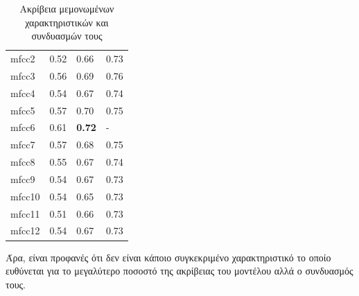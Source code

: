 \begin{table}[H]
\begin{tabular}{llll}
mfcc2                   & 0.52                        & 0.66                       & 0.73                       \\
mfcc3                   & 0.56                        & 0.69                       & 0.76                       \\
mfcc4                   & 0.54                        & 0.67                       & 0.74                       \\
mfcc5                   & 0.57                        & 0.70                       & 0.75                       \\
mfcc6                   & 0.61                        & \textbf{0.72}              & -                          \\
mfcc7                   & 0.57                        & 0.68                       & 0.75                       \\
mfcc8                   & 0.55                        & 0.67                       & 0.74                       \\
mfcc9                   & 0.54                        & 0.67                       & 0.73                       \\
mfcc10                  & 0.54                        & 0.65                       & 0.73                       \\
mfcc11                  & 0.51                        & 0.66                       & 0.73                       \\
mfcc12                  & 0.54                        & 0.67                       & 0.73                      
\end{tabular}
\caption{Ακρίβεια μεμονωμένων χαρακτηριστικών και συνδυασμών τους}
\end{table}

Άρα, είναι προφανές ότι δεν είναι κάποιο συγκεκριμένο χαρακτηριστικό το οποίο ευθύνεται για το μεγαλύτερο ποσοστό της ακρίβειας του μοντέλου αλλά ο συνδυασμός τους.









